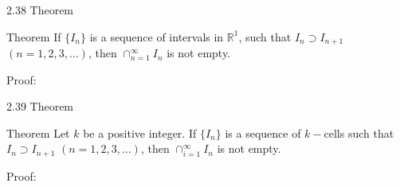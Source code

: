 \documentclass{beamer}
\begin{document}
\begin{frame}{2.38 Theorem}
\begin{block}{Theorem}
If \(\{I_n\}\) is a sequence of intervals in \(\mathbb{R}^1\), such that \(I_n \supset I_{n+1}\) \((n=1,2,3,\dots)\), then \(\cap_{n=1}^\infty I_n\) is not empty. 
\end{block}
\begin{block}{Proof:}

\end{block}
\end{frame}

\begin{frame}{2.39 Theorem}
\begin{block}{Theorem}
Let \(k\) be a positive integer. If \(\{I_n\}\) is a sequence of \(k-\)cells such that \(I_n \supset I_{n+1}\) \((n=1,2,3,\dots)\), then \(\cap_{i=1}^\infty I_n\) is not empty. 
\end{block}
\begin{block}{Proof:}

\end{block}
\end{frame}
\end{document}
